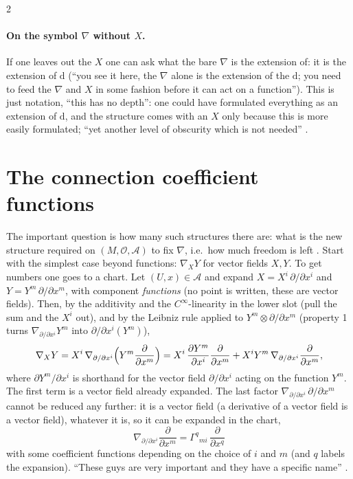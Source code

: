 \begin{paracol}{2}
\paragraph{On the symbol $\nabla$ without $X$.} If one leaves out the $X$ one can ask what the bare $\nabla$ is the extension of: it is the extension of $\mathrm d$ (``you see it here, the $\nabla$ alone is the extension of the $\mathrm d$; you need to feed the $\nabla$ and $X$ in some fashion before it can act on a function''). This is just notation, ``this has no depth'': one could have formulated everything as an extension of $\mathrm d$, and the structure comes with an $X$ only because this is more easily formulated; ``yet another level of obscurity which is not needed'' .

\section{The connection coefficient functions}\label{sec:c07-gamma}

The important question is how many such structures there are: what is the new structure required on $(M,\mathcal O,\mathcal A)$ to fix $\nabla$, i.e.\ how much freedom is left . Start with the simplest case beyond functions: $\nabla_XY$ for vector fields $X,Y$. To get numbers one goes to a chart.
Let $(U,x)\in\mathcal A$ and expand $X=X^i\,\partial/\partial x^i$ and $Y=Y^m\,\partial/\partial x^m$, with component \emph{functions} (no point is written, these are vector fields). Then, by the additivity and the $C^\infty$-linearity in the lower slot (pull the sum and the $X^i$ out), and by the Leibniz rule applied to $Y^m\otimes\partial/\partial x^m$ (property 1 turns $\nabla_{\partial/\partial x^i}Y^m$ into $\partial/\partial x^i(Y^m)$),
\[
  \nabla_XY=X^i\,\nabla_{\partial/\partial x^i}\Bigl(Y^m\frac{\partial}{\partial x^m}\Bigr)=X^i\,\frac{\partial Y^m}{\partial x^i}\frac{\partial}{\partial x^m}+X^iY^m\,\nabla_{\partial/\partial x^i}\frac{\partial}{\partial x^m},
\]
where $\partial Y^m/\partial x^i$ is shorthand for the vector field $\partial/\partial x^i$ acting on the function $Y^m$.
The first term is a vector field already expanded. The last factor $\nabla_{\partial/\partial x^i}\,\partial/\partial x^m$ cannot be reduced any further: it is a vector field (a derivative of a vector field is a vector field), whatever it is, so it can be expanded in the chart,
\[
  \nabla_{\partial/\partial x^i}\frac{\partial}{\partial x^m}=\Gamma^q{}_{mi}\,\frac{\partial}{\partial x^q}
\]
with some coefficient functions depending on the choice of $i$ and $m$ (and $q$ labels the expansion). ``These guys are very important and they have a specific name''
.


\end{paracol}

